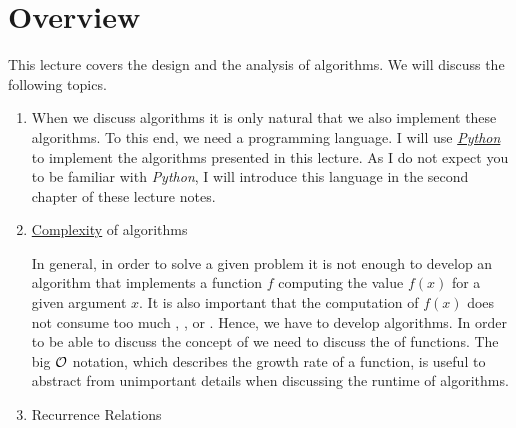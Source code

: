 \section{Overview}
This lecture covers the design and the analysis of algorithms.  We will discuss the following topics.
\begin{enumerate}
\item When we discuss algorithms it is only natural that we also implement these algorithms.  To this end, we need a
      programming language.  I will use \href{https://python.org}{\textsl{Python}} to implement the algorithms
      presented in this lecture.  As I do not expect you to be familiar with \textsl{Python}, I will introduce
      this language in the second chapter of these lecture notes.
\item \href{http://en.wikipedia.org/wiki/Computational_complexity_theory}{Complexity}  of algorithms

      In general, in order to solve a given problem it is not enough to develop an algorithm that
      implements a function $f$ computing the  value $f(x)$ for a given argument $x$.  It is also important  
      that the computation of $f(x)$ does not consume too much , , or .
      Hence, we have to develop  algorithms.  In order to be able to discuss the concept of
       we need to discuss the  of functions.  The big $\mathcal{O}$ notation, which
      describes the growth rate of a function, is useful to abstract from unimportant details when discussing the
      runtime of algorithms.
\item Recurrence Relations


\end{enumerate}
